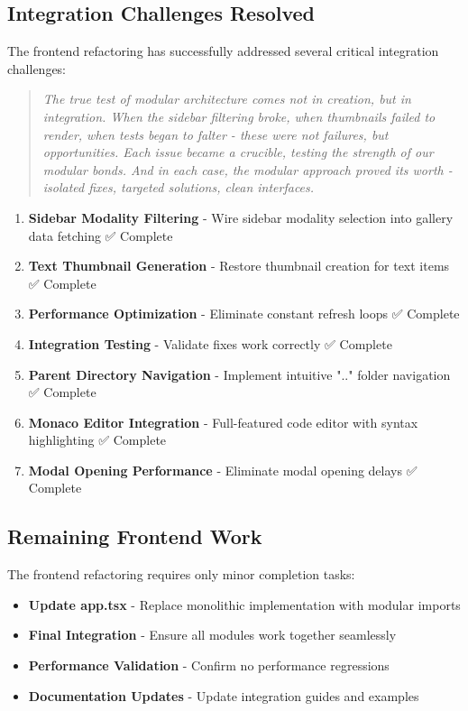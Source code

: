 \documentclass[11pt]{article}
\begin{document}
\subsection{Integration Challenges Resolved}

The frontend refactoring has successfully addressed several critical integration challenges:

\begin{quote}
\emph{The true test of modular architecture comes not in creation, but in integration. When the sidebar filtering broke, when thumbnails failed to render, when tests began to falter - these were not failures, but opportunities. Each issue became a crucible, testing the strength of our modular bonds. And in each case, the modular approach proved its worth - isolated fixes, targeted solutions, clean interfaces.}
\end{quote}

\begin{enumerate}
\item \textbf{Sidebar Modality Filtering} - Wire sidebar modality selection into gallery data fetching ✅ Complete
\item \textbf{Text Thumbnail Generation} - Restore thumbnail creation for text items ✅ Complete
\item \textbf{Performance Optimization} - Eliminate constant refresh loops ✅ Complete
\item \textbf{Integration Testing} - Validate fixes work correctly ✅ Complete
\item \textbf{Parent Directory Navigation} - Implement intuitive ".." folder navigation ✅ Complete
\item \textbf{Monaco Editor Integration} - Full-featured code editor with syntax highlighting ✅ Complete
\item \textbf{Modal Opening Performance} - Eliminate modal opening delays ✅ Complete
\end{enumerate}

\subsection{Remaining Frontend Work}

The frontend refactoring requires only minor completion tasks:

\begin{itemize}
\item \textbf{Update app.tsx} - Replace monolithic implementation with modular imports
\item \textbf{Final Integration} - Ensure all modules work together seamlessly
\item \textbf{Performance Validation} - Confirm no performance regressions
\item \textbf{Documentation Updates} - Update integration guides and examples
\end{itemize}
\end{document}
